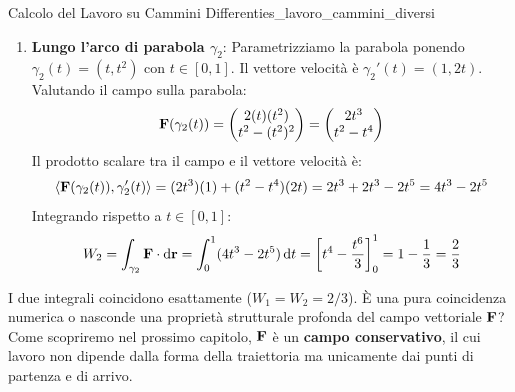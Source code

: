 \begin{esempio}{Calcolo del Lavoro su Cammini Differenti}{es_lavoro_cammini_diversi}
\begin{enumerate}
    \item \textbf{Lungo l'arco di parabola $\gamma_2$}:
    Parametrizziamo la parabola ponendo $\gamma_2(t) = (t, t^2)$ con $t \in [0, 1]$.
    Il vettore velocità è $\gamma_2'(t) = (1, 2t)$.
    Valutando il campo sulla parabola:
    \[
    \mathbf{F}(\gamma_2(t)) = \begin{pmatrix} 2(t)(t^2) \\ t^2 - (t^2)^2 \end{pmatrix} = \begin{pmatrix} 2t^3 \\ t^2 - t^4 \end{pmatrix}
    \]
    Il prodotto scalare tra il campo e il vettore velocità è:
    \[
    \langle\mathbf{F}(\gamma_2(t)), \gamma_2'(t)\rangle = (2t^3)(1) + (t^2 - t^4)(2t) = 2t^3 + 2t^3 - 2t^5 = 4t^3 - 2t^5
    \]
    Integrando rispetto a $t \in [0, 1]$:
    \[
    W_2 = \int_{\gamma_2} \mathbf{F} \cdot \mathop{}\!\mathrm{d}\mathbf{r} = \int_{0}^{1} (4t^3 - 2t^5) \mathop{}\!\mathrm{d} t = \left[ t^4 - \frac{t^6}{3} \right]_{0}^{1} = 1 - \frac{1}{3} = \frac{2}{3}
    \]
\end{enumerate}
I due integrali coincidono esattamente ($W_1 = W_2 = 2/3$). È una pura coincidenza numerica o nasconde una proprietà strutturale profonda del campo vettoriale $\mathbf{F}$? Come scopriremo nel prossimo capitolo, $\mathbf{F}$ è un \textbf{campo conservativo}, il cui lavoro non dipende dalla forma della traiettoria ma unicamente dai punti di partenza e di arrivo.
\end{esempio}
